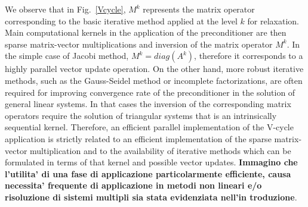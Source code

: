 We observe that in Fig.~\ref{Vcycle}, $M^k$ represents the matrix
operator corresponding to the basic iterative method applied at the
level $k$ for relaxation. 
Main computational kernels in the application of the preconditioner
are then sparse matrix-vector multiplications and inversion of the
matrix operator $M^k$. In the simple case of Jacobi method,
$M^k=diag(A^k)$, therefore it corresponds to a highly parallel vector
update operation. On the other hand, more robust iterative methods,
such as the Gauss-Seidel method or incomplete factorizations, are
often required for improving convergence rate of the preconditioner in
the solution of general linear systems. In that cases the inversion of
the corresponding matrix operators require the solution of triangular
systems that is an intrinsically sequential kernel. Therefore, an
efficient parallel implementation of the V-cycle application is
strictly related to an efficient implementation of the sparse
matrix-vector multiplication and to the availability of iterative
methods which can be formulated in terms of that kernel and possible
vector updates. 
\textbf{Immagino che l'utilita' di una fase di applicazione
  particolarmente efficiente, causa necessita' frequente di
  applicazione in metodi non lineari e/o risoluzione di sistemi
  multipli sia stata evidenziata nell'in troduzione}.
